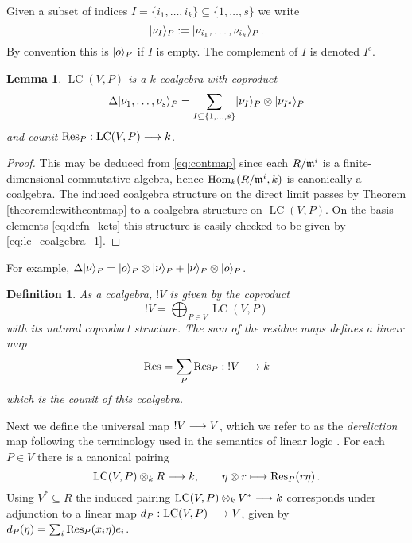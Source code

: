 \documentclass[english,letter paper,12pt,reqno]{article}
\DeclarePairedDelimiter\ket{\lvert}{\rangle}
\newtheorem{lemma}[theorem]{Lemma}
\theoremstyle{example}
\newtheorem{definition}[theorem]{Definition}
\numberwithin{equation}{section}
\def\Hom{\operatorname{Hom}}
\DeclareMathOperator{\LC}{LC}
\begin{document}
Given a subset of indices $I =  \{ i_1, \ldots, i_k \} \subseteq \{ 1, \ldots, s \}$ we write
\begin{equation}\label{eq:nu_I}
\ket{ \nu_I }_P := \ket{ \nu_{i_1}, \ldots, \nu_{i_k} }_P\,.
\end{equation}
By convention this is $\ket{o}_P$ if $I$ is empty. The complement of $I$ is denoted $I^c$.

\begin{lemma}\label{lemma:lc_coalgebra} $\LC(V,P)$ is a $k$-coalgebra with coproduct
\begin{equation}\label{eq:lc_coalgebra_1}
\Delta \ket{ \nu_1, \ldots, \nu_s }_P = \sum_{I \subseteq \{ 1, \ldots, s \}} \ket{ \nu_I }_P \otimes \ket{ \nu_{I^c} }_P
\end{equation}
and counit $\Res_P: \LC(V,P) \lto k$.
\end{lemma}
\begin{proof}
This may be deduced from \eqref{eq:contmap} since each $R/\mathfrak{m}^i$ is a finite-dimensional commutative algebra, hence $\Hom_k( R/\mf{m}^i, k )$ is canonically a coalgebra. The induced coalgebra structure on the direct limit passes by Theorem \ref{theorem:lcwithcontmap} to a coalgebra structure on $\LC(V,P)$. On the basis elements \eqref{eq:defn_kets} this structure is easily checked to be given by \eqref{eq:lc_coalgebra_1}.
\end{proof}

For example, $\Delta \ket{\nu}_P = \ket{o}_P \otimes \ket{\nu}_P + \ket{\nu}_P \otimes \ket{o}_P$.

\begin{definition}\label{definition:bang} As a coalgebra, $!V$ is given by the coproduct
\begin{equation}
!V = \bigoplus_{P \in V} \LC(V,P)
\end{equation}
with its natural coproduct structure. The sum of the residue maps defines a linear map
\begin{equation}\label{eq:residue_der}
\operatorname{Res}\!\, = \sum_P \operatorname{Res}\!_P: {!}V \longrightarrow k
\end{equation}
which is the counit of this coalgebra.
\end{definition}

Next we define the universal map ${!} V \longrightarrow V$, which we refer to as the \emph{dereliction} map following the terminology used in the semantics of linear logic \cite{mellies}. For each $P \in V$ there is a canonical pairing
\[
\LC(V,P) \otimes_k R \lto k, \qquad \eta \otimes r \longmapsto \Res_P(r \eta)\,.
\]
Using $V^* \subseteq R$ the induced pairing $\LC(V,P) \otimes_k V^* \lto k$ corresponds under adjunction to a linear map $d_P: \LC(V,P) \lto V$, given by $d_P( \eta ) = \sum_i \operatorname{Res}\!_P( x_i \eta ) e_i$.
\end{document}
